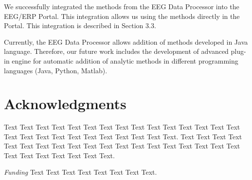 \documentclass{frontiersSCNS} %
\begin{document}
We successfully integrated the methods from the EEG Data Processor into the EEG/ERP Portal. This integration allows us using the methods directly in the Portal. This integration is described in Section 3.3.

Currently, the EEG Data Processor allows addition of methods developed in Java language. Therefore, our future work includes the development of advanced plug-in engine for automatic addition of analytic methods in different programming languages (Java, Python, Matlab).

\section*{Acknowledgments}
Text Text Text Text Text Text  Text Text Text Text Text Text Text Text  Text Text Text Text Text Text Text Text Text  Text Text Text. Text Text Text Text Text Text  Text Text Text Text Text Text Text Text  Text Text Text Text Text Text Text Text Text  Text Text Text.


\textit{Funding\textcolon} Text Text Text Text Text Text  Text Text.













\end{document}
